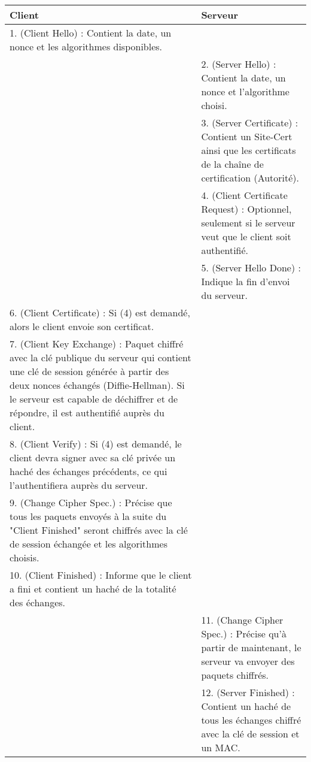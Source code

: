 \begin{tabular}{|m{8cm}|m{8cm}|}
   \hline
  \rowcolor[gray]{.8} Client & Serveur \\
   \hline
1. (Client Hello) : Contient la date, un nonce et les algorithmes disponibles. & \\
   \hline
&2. (Server Hello) : Contient la date, un nonce et l'algorithme choisi.\\
   \hline
& 3. (Server Certificate) :  Contient un Site-Cert ainsi que les certificats de la chaîne de certification (Autorité).\\
   \hline
& 4. (Client Certificate Request) : Optionnel, seulement si le serveur veut que le client soit authentifié.\\
   \hline
& 5. (Server Hello Done) : Indique la fin d'envoi du serveur.\\
   \hline
6. (Client Certificate) : Si (4) est demandé, alors le client envoie son certificat. & \\
   \hline
7. (Client Key Exchange) : Paquet chiffré avec la clé publique du serveur qui contient une clé de session générée à partir des deux nonces échangés (Diffie-Hellman). Si le serveur est capable de déchiffrer et de répondre, il est authentifié auprès du client. & \\
   \hline
8. (Client Verify) : Si (4) est demandé, le client devra signer avec sa clé privée un haché des échanges précédents, ce qui l'authentifiera auprès du serveur. & \\
   \hline
9. (Change Cipher Spec.) : Précise que tous les paquets envoyés à la suite du "Client Finished" seront chiffrés avec la clé de session échangée et les algorithmes choisis. & \\
   \hline
10. (Client Finished) : Informe que le client a fini et contient un haché de la totalité des échanges. & \\
   \hline
& 11. (Change Cipher Spec.) : Précise qu'à partir de maintenant, le serveur va envoyer des paquets chiffrés. \\
   \hline
& 12. (Server Finished) : Contient un haché de tous les échanges chiffré avec la clé de session et un MAC.\\
   \hline
\end{tabular}

